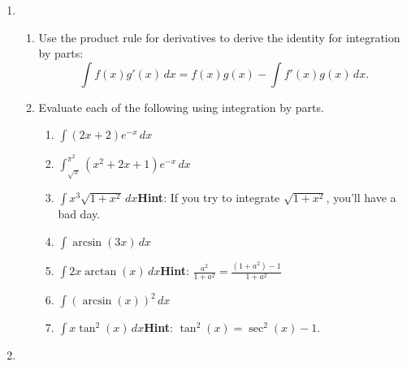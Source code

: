 \documentclass[12 pt]{article}
\newcommand{\hint}[1]{\hspace{0.5in}\textbf{Hint}: #1}
\begin{document}
\begin{enumerate}[leftmargin=0in, rightmargin=-0.25in]
\begin{enumerate}
		\item $\int\tan(x)\,dx$
		\vspace{0.25in}
		\item $\int\sec(x)\,dx$\hint{$\frac{\sec(x)+\tan(x)}{\sec(x)+\tan(x)}=1$.}
	\end{enumerate}
	\newpage
	\item \begin{enumerate}
		\item Use the product rule for derivatives to derive the identity for integration by parts:
		$$\int f(x)g'(x)\,dx=f(x)g(x)-\int f'(x)g(x)\,dx.$$
		\item Evaluate each of the following using integration by parts.
		\begin{enumerate}
			\item $\int (2x+2)e^{-x}\,dx$
			\item $\int_{\sqrt{\pi}}^{\pi^2}(x^2+2x+1)e^{-x}\,dx$
			\item $\int x^3\sqrt{1+x^2}\,dx$\hint{If you try to integrate $\sqrt{1+x^2}$, you'll have a bad day.}
			\item $\int\arcsin(3x)\,dx$
			\item $\int 2x\arctan(x)\,dx$\hint{$\frac{a^2}{1+a^2}=\frac{(1+a^2)-1}{1+a^2}$}
			\item $\int (\arcsin(x))^2\,dx$
			\item $\int x\tan^2(x)\,dx$\hint{$\tan^2(x)=\sec^2(x)-1$.}
		\end{enumerate}
		\vspace{0.25in}
	\end{enumerate}
	\newpage
	\item \begin{enumerate}

\end{enumerate}
\end{enumerate}
\end{document}
